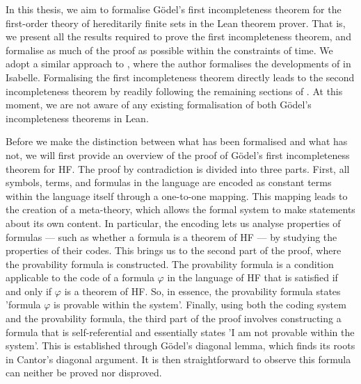 In this thesis, we aim to formalise Gödel's first incompleteness theorem for the first-order theory of
hereditarily finite sets in the Lean theorem prover. 
That is, we present all the results required to prove the first
incompleteness theorem, and formalise as much of the proof as possible within the constraints of 
time. We adopt a similar approach to \cite{paulson2014machine}, where the author formalises the 
developments of \cite{swierczkowski2003finite} in Isabelle.
Formalising the first incompleteness theorem directly leads to the second incompleteness theorem
by readily following the remaining sections of \cite{swierczkowski2003finite}.
At this moment, we are not aware of any existing formalisation of both Gödel's incompleteness 
theorems in Lean.

Before we make the distinction between what has been formalised and what has not,
we will first provide an overview of the proof of Gödel's first incompleteness theorem for HF.
The proof by contradiction is divided into three parts.
First, all symbols, terms, and formulas in the language are encoded as constant terms within the
language itself through a one-to-one mapping.
This mapping leads to the creation of a meta-theory, 
which allows the formal system to make statements about its own content. 
In particular, the encoding lets us analyse properties of formulas — such as whether a formula 
is a theorem of HF — by studying the properties of their codes.
This brings us to the second part of the proof, where the provability formula is constructed.
The provability formula is a condition applicable to the code of a formula $\varphi$ 
in the language of HF that is satisfied if and only if $\varphi$ is a theorem of HF.
So, in essence, the provability formula states 'formula $\varphi$ is provable within the system'.
Finally, using both the coding system and the provability formula, 
the third part of the proof involves constructing a formula that is self-referential and 
essentially states 'I am not provable within the system'. This is established through 
Gödel's diagonal lemma, which finds its roots in Cantor's diagonal argument.
It is then straightforward to observe this formula can neither be proved nor disproved.

